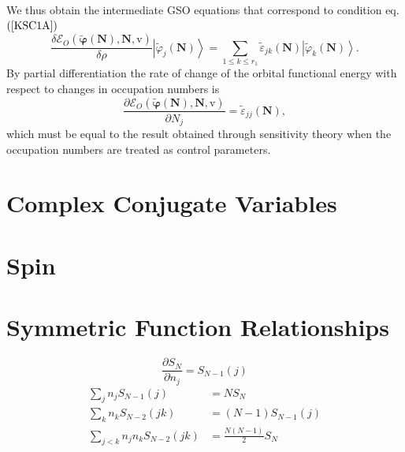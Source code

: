 \documentclass[aps,preprint]{revtex4}%
\begin{document}
We thus obtain the intermediate GSO equations that correspond to condition eq.
$\left(  \ref{KSC1A}\right)  $
\begin{equation}
\frac{\delta\mathcal{E}_{O}\left(  \boldsymbol{\tilde{\varphi}}\left(
\boldsymbol{N}\right)  ,\boldsymbol{N,}\mathrm{v}\right)  }{\delta\rho
}\left\vert \tilde{\varphi}_{j}\left(  \boldsymbol{N}\right)  \right\rangle
=\sum_{1\leq k\leq r_{1}}\tilde{\varepsilon}_{jk}\left(  \boldsymbol{N}%
\right)  \left\vert \tilde{\varphi}_{k}\left(  \boldsymbol{N}\right)
\right\rangle .
\end{equation}
By partial differentiation the rate of change of the orbital functional energy
with respect to changes in occupation numbers is
\begin{equation}
\frac{\partial\mathcal{E}_{O}\left(  \boldsymbol{\tilde{\varphi}}\left(
\boldsymbol{N}\right)  ,\boldsymbol{N,}\mathrm{v}\right)  }{\partial N_{j}%
}=\tilde{\varepsilon}_{jj}\left(  \boldsymbol{N}\right)  ,
\end{equation}
which must be equal to the result obtained through sensitivity theory when the
occupation numbers are treated as control parameters.

\section{Complex Conjugate Variables \label{ComplexConjugate}}

\section{Spin\label{Spin}}

\section{Symmetric Function Relationships}%

\begin{equation}
\frac{\partial S_{N}}{\partial n_{j}}=S_{N-1}\left(  j\right)
\end{equation}%
\begin{align}
\sum_{j}n_{j}S_{N-1}\left(  j\right)   &  =NS_{N}\\
\sum_{k}n_{k}S_{N-2}\left(  jk\right)   &  =\left(  N-1\right)  S_{N-1}\left(
j\right) \\
\sum_{j<k}n_{j}n_{k}S_{N-2}\left(  jk\right)   &  =\frac{N\left(  N-1\right)
}{2}S_{N}%
\end{align}
\end{document}
